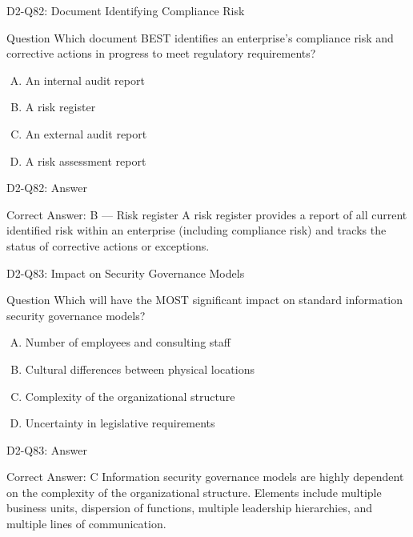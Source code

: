 \documentclass{beamer}
\begin{document}
	\begin{frame}{D2-Q82: Document Identifying Compliance Risk}
		\begin{block}{Question}
			Which document BEST identifies an enterprise's compliance risk and corrective actions in progress to meet regulatory requirements?
		\end{block}
		\begin{enumerate}[(A)]
			\item An internal audit report
			\item A risk register
			\item An external audit report
			\item A risk assessment report
		\end{enumerate}
	\end{frame}
	\begin{frame}{D2-Q82: Answer}
		\begin{block}{Correct Answer: B --- Risk register}
			A risk register provides a report of all current identified risk within an enterprise (including compliance risk) and tracks the status of corrective actions or exceptions.
		\end{block}
	\end{frame}
	
	\begin{frame}{D2-Q83: Impact on Security Governance Models}
		\begin{block}{Question}
			Which will have the MOST significant impact on standard information security governance models?
		\end{block}
		\begin{enumerate}[(A)]
			\item Number of employees and consulting staff
			\item Cultural differences between physical locations
			\item Complexity of the organizational structure
			\item Uncertainty in legislative requirements
		\end{enumerate}
	\end{frame}
	\begin{frame}{D2-Q83: Answer}
		\begin{block}{Correct Answer: C}
			Information security governance models are highly dependent on the complexity of the organizational structure. Elements include multiple business units, dispersion of functions, multiple leadership hierarchies, and multiple lines of communication.
		\end{block}
	\end{frame}
	
\end{document}
